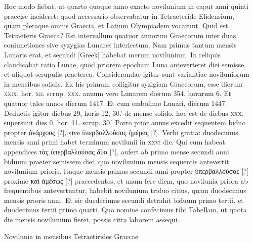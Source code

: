 Hoc modo fiebat, ut quarto quoque anno exacto novilunium
in caput anni quinti praecise incideret: quod necessario observabatur
in Tetraeteride Elidensium, quam pleraque omnis Graecia,
et Latium Olympiadem vocarunt.
Quid est Tetraeteris Graeca?
Est
intervallum quatuor annorum Graecorum inter duas coniunctiones sive
syzygias Lunares interiectum.
Nam primus tantum mensis Lunaris
erat, et secundi \textgreek{[Greek]} habebat merum novilunium.
In reliquis
claudicabat ratio Lunae, quod priorem epocham Luna anteverteret
diei semisse, et aliquot scrupulis praeterea.
Considerandae igitur sunt
variantiae noviluniorum in mensibus solidis.
Ex his primum colligitur
syzigiam Graecorum, esse dierum \textsc{xxix}.
 hor. \textsc{xii}. scrup. \textsc{xxx}. annum
vero Lunarem dierum 354. horarum 6.
Et quatuor tales annos dierum
1417.
Et cum embolimo Lunari, dierum 1447.
Deductis igitur
diebus 29, horis 12, 30.' de mense solido, hoc est de diebus \textsc{xxx}.
supersunt dies 0. hor. 11. scrup. 30.'
Porro prior annus excedit sequentem
biduo propter \textgreek{ἀνάρχους [?]},
 sive \textgreek{ὑπερβαλλούσας ἡμέρας [?]}.
Verbi gratia:
duodecimus mensis anni primi habet terminum novilunii in \textsc{xxvi}
die.
Qui cum habeat appendices \textgreek{τὰς ὑπερβαλλούσας δὺο [?]},
 aufert ab primo
mense secundi anni biduum praeter semissem diei, quo novilunium
mensis sequentis antevertit novilunium prioris.
Itaque mensis primus
secundi anni propter \textgreek{ὑπερβαλλούσας [?]} proxime
 \textgreek{καὶ ἀμέσως [?]} praecedentes, et unum
fere diem, quo novilunia priora ab frequentibus antevertuntur, habebit
novilunium triduo citius, quam duodecimus mensis prioris anni.
Et sic duedecimus secundi detrahit biduum primo tertii, et duodecimus
tertii primo quarti.
Quo nomine confecimus tibi Tabellam, ut
quota die mensis novilunium fieret, possis citra laborem assequi.
\begin{table}[htbp]
 \centering
 
 \caption{Novilunia in mensibus Tetraetirides Graecae}
 \label{tab:novilunia}
\end{table}


